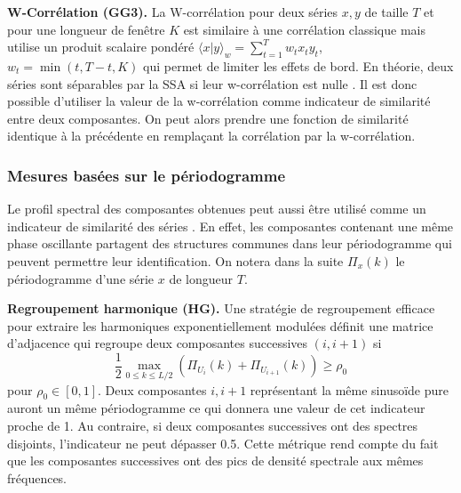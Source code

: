 \documentclass{gretsi}
\begin{document}
\textbf{W-Corrélation (GG3).}\label{par:GG3} 
    La W-corrélation pour deux séries $x, y$ de taille $T$ et pour une longueur de fenêtre $K$ est similaire à une corrélation classique mais utilise un produit scalaire pondéré $\langle x|y\rangle_w = \sum_{t=1}^Tw_t x_t y_t$, $w_t = \min(t, T-t, K)$ qui permet de limiter les effets de bord.
    En théorie, deux séries sont séparables par la SSA si leur w-corrélation est nulle \cite{Golyandina_10_ssa}.
    Il est donc possible d'utiliser la valeur de la w-corrélation comme indicateur de similarité entre deux composantes.
    On peut alors prendre une fonction de similarité identique à la précédente en remplaçant la corrélation par la w-corrélation.

\subsubsection{Mesures basées sur le périodogramme}\label{ssub:per}
Le profil spectral des composantes obtenues peut aussi être utilisé comme un indicateur de similarité des séries \cite{Golyandina_10_ssa}.
En effet, les composantes contenant une même phase oscillante partagent des structures communes dans leur périodogramme qui peuvent permettre leur identification.
On notera dans la suite $\Pi_x(k)$ le périodogramme d'une série $x$ de longueur $T$.


\textbf{Regroupement harmonique (HG).}\label{par:HG}
    Une stratégie de regroupement efficace pour extraire les harmoniques exponentiellement modulées \cite{alexandrov_05_auto} définit une matrice d'adjacence qui regroupe deux composantes successives $(i, i+1)$ si 
    \begin{equation}
        \frac{1}{2}\max_{0\le k \le L/2}\left(\Pi_{U_i}(k) + \Pi_{U_{i+1}}(k)\right) \ge \rho_0 
    \end{equation}
    pour $\rho_0\in \left[0, 1\right]$.
    Deux composantes $i, i+1$ représentant la même sinusoïde pure auront un même périodogramme ce qui donnera une valeur de cet indicateur proche de 1.
    Au contraire, si deux composantes successives ont des spectres disjoints, l'indicateur ne peut dépasser 0.5.
    Cette métrique rend compte du fait que les composantes successives ont des pics de densité spectrale aux mêmes fréquences.
\end{document}
